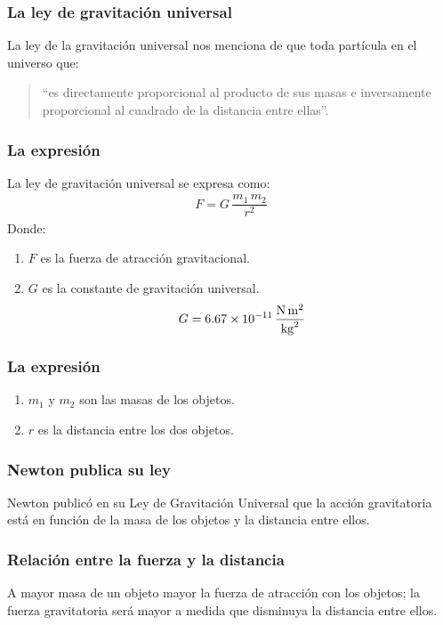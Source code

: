 \documentclass[14pt]{beamer}
\begin{document}
\begin{frame}
\frametitle{La ley de gravitación universal}
La ley de la gravitación universal nos menciona de que toda partícula en el universo  que:
\pause
\begin{quote}
“es directamente proporcional al producto de sus masas e inversamente proporcional al cuadrado de la distancia entre ellas”.
\end{quote}
\end{frame}
\begin{frame}
\frametitle{La expresión}
La ley de gravitación universal se expresa como:
\pause
\begin{align*}
F = G \, \dfrac{m_{1} \, m_{2}}{r^{2}}
\end{align*}
Donde:
\pause
{}
\begin{enumerate}[<+->]
\item $F$ es la fuerza de atracción gravitacional.
\item $G$ es la constante de gravitación universal.
\begin{align*}
G = \SI[per-mode=fraction]{6.67d-11}{\newton\square\meter\per\square\kilo\gram}
\end{align*}
\seti
\end{enumerate}
\end{frame}
\begin{frame}
\frametitle{La expresión}
\begin{enumerate}[<+->]    
\conti
\item $m_{1}$ y $m_{2}$ son las masas de los objetos.
\item $r$ es la distancia entre los dos objetos.
\end{enumerate}
\end{frame}
\begin{frame}
\frametitle{Newton publica su ley}
Newton publicó en su Ley de Gravitación Universal que la acción gravitatoria está en función de la masa de los objetos y la distancia entre ellos.
\end{frame}
\begin{frame}
\frametitle{Relación entre la fuerza y la distancia}
A mayor masa de un objeto mayor la fuerza de atracción con los objetos; \pause la fuerza gravitatoria será mayor a medida que disminuya la distancia entre ellos.
\end{frame}
\end{document}
